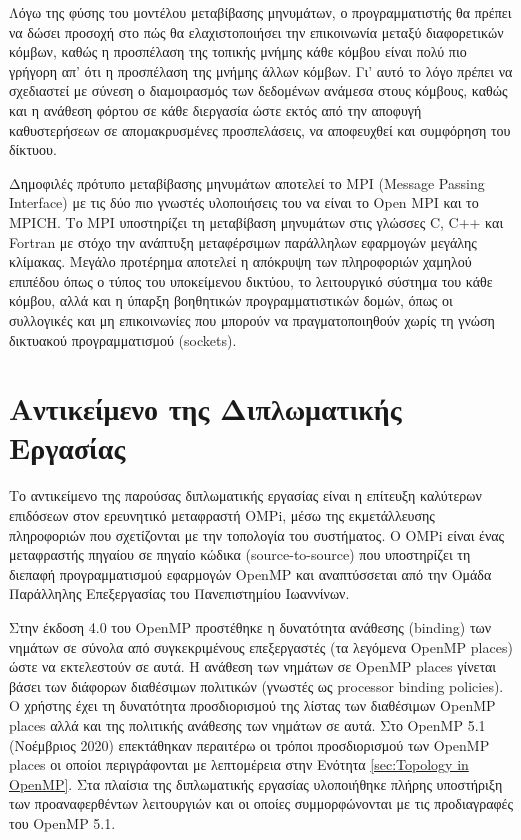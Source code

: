 Λόγω της φύσης του μοντέλου μεταβίβασης μηνυμάτων, ο προγραμματιστής θα πρέπει να δώσει προσοχή στο πώς θα ελαχιστοποιήσει την επικοινωνία μεταξύ διαφορετικών κόμβων, καθώς η προσπέλαση της τοπικής μνήμης κάθε κόμβου είναι πολύ πιο γρήγορη απ' ότι η προσπέλαση της μνήμης άλλων κόμβων. Γι' αυτό το λόγο πρέπει να σχεδιαστεί με σύνεση ο διαμοιρασμός των δεδομένων ανάμεσα στους κόμβους, καθώς και η ανάθεση φόρτου σε κάθε διεργασία ώστε εκτός από την αποφυγή καθυστερήσεων σε απομακρυσμένες προσπελάσεις, να αποφευχθεί και συμφόρηση του δίκτυου.

Δημοφιλές πρότυπο μεταβίβασης μηνυμάτων αποτελεί το MPI (Message Passing Interface) με τις δύο πιο γνωστές υλοποιήσεις του να είναι το Open MPI και το MPICH. Το MPI υποστηρίζει τη μεταβίβαση μηνυμάτων στις γλώσσες C, C++ και Fortran με στόχο την ανάπτυξη μεταφέρσιμων παράλληλων εφαρμογών μεγάλης κλίμακας. Μεγάλο προτέρημα αποτελεί η απόκρυψη των πληροφοριών χαμηλού επιπέδου όπως ο τύπος του υποκείμενου δικτύου, το λειτουργικό σύστημα του κάθε κόμβου, αλλά και η ύπαρξη βοηθητικών προγραμματιστικών δομών, όπως οι συλλογικές και μη επικοινωνίες που μπορούν να πραγματοποιηθούν χωρίς τη γνώση δικτυακού προγραμματισμού (sockets).


\section{Αντικείμενο της Διπλωματικής Εργασίας}
\label{sec:Subject of the Diploma Thesis}
Το αντικείμενο της παρούσας διπλωματικής εργασίας είναι η επίτευξη καλύτερων επιδόσεων στον ερευνητικό μεταφραστή OMPi, μέσω της εκμετάλλευσης πληροφοριών που σχετίζονται με την τοπολογία του συστήματος. Ο OMPi είναι ένας μεταφραστής πηγαίου σε πηγαίο κώδικα (source-to-source) που υποστηρίζει τη διεπαφή προγραμματισμού εφαρμογών OpenMP και αναπτύσσεται από την Ομάδα Παράλληλης Επεξεργασίας του Πανεπιστημίου Ιωαννίνων.

Στην έκδοση 4.0 του OpenMP προστέθηκε η δυνατότητα ανάθεσης (binding) των νημάτων σε σύνολα από συγκεκριμένους επεξεργαστές (τα λεγόμενα OpenMP places) ώστε να εκτελεστούν σε αυτά. Η ανάθεση των νημάτων σε OpenMP places γίνεται βάσει των διάφορων διαθέσιμων πολιτικών (γνωστές ως processor binding policies). Ο χρήστης έχει τη δυνατότητα προσδιορισμού της λίστας των διαθέσιμων OpenMP places αλλά και της πολιτικής ανάθεσης των νημάτων σε αυτά. Στο OpenMP 5.1 (Νοέμβριος 2020) επεκτάθηκαν περαιτέρω οι τρόποι προσδιορισμού των OpenMP places οι οποίοι περιγράφονται με λεπτομέρεια στην Ενότητα \ref{sec:Topology in OpenMP}. Στα πλαίσια της διπλωματικής εργασίας υλοποιήθηκε πλήρης υποστήριξη των προαναφερθέντων λειτουργιών και οι οποίες συμμορφώνονται με τις προδιαγραφές του OpenMP 5.1.

